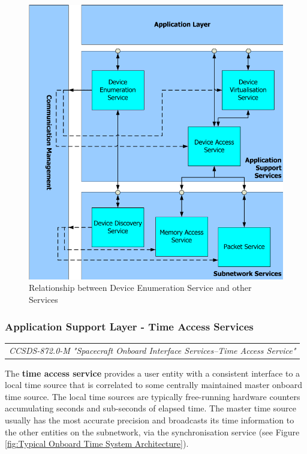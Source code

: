 \begin{figure}[h]
\centering\includegraphics[scale=0.3]{fig/relationship_between_device_enumeration_service_and_other_services}
\caption{Relationship between Device Enumeration Service and other Services}
\label{fig:Relationship between Device Enumeration Service and other Services}
\end{figure}

\subsubsection{Application Support Layer - Time Access Services}

\begin{tabular}{l}
\textit{CCSDS-872.0-M "Spacecraft Onboard Interface Services--Time Access Service" \cite{}} 
\end{tabular}

The \textbf{time access service} provides a user entity with a consistent interface to a local time source that is correlated to some centrally maintained master onboard time source. The local time sources are typically free-running hardware counters accumulating seconds and sub-seconds of elapsed time. The master time source usually has the most accurate precision and broadcasts its time information to the other entities on the subnetwork, via the synchronisation service (see Figure \ref{fig:Typical Onboard Time System Architecture}). 

